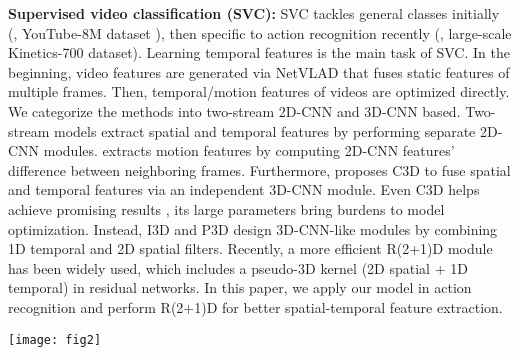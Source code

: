 \documentclass[10pt,twocolumn,letterpaper]{article}
\newlength\figsep\setlength{\figsep}{-2.8ex}
\begin{document}
{\bf Supervised video classification (SVC):}
SVC tackles general classes initially (\eg, YouTube-8M dataset \cite{abu2016youtube}), then specific to action recognition recently (\eg, large-scale Kinetics-700 dataset\cite{carreira2017quo}).
Learning temporal features is the main task of SVC.
In the beginning, video features are generated via NetVLAD \cite{miech2017learnable,lin2018nextvlad} that fuses static features of multiple frames.
Then, temporal/motion features of videos are optimized directly. 
We categorize the methods into two-stream 2D-CNN and 3D-CNN based.
Two-stream models \cite{simonyan2014two,wang2016temporal,lin2019tsm} extract spatial and temporal features by performing separate 2D-CNN modules.
\cite{jiang2019stm,liu2020teinet} extracts motion features by computing 2D-CNN features' difference between neighboring frames.
Furthermore, \cite{tran2015learning} proposes C3D to fuse spatial and temporal features via an independent 3D-CNN module.
Even C3D helps achieve promising results \cite{feichtenhofer2019slowfast,sudhakaran2020gate}, its large parameters bring burdens to model optimization.
Instead, I3D \cite{carreira2017quo} and P3D \cite{qiu2017learning} design 3D-CNN-like modules by combining 1D temporal and 2D spatial filters. 
Recently, a more efficient R(2+1)D module \cite{tran2018closer} has been widely used, which includes a pseudo-3D kernel (2D spatial + 1D temporal) in residual networks.
In this paper, we apply our model in action recognition and perform R(2+1)D for better spatial-temporal feature extraction.
\begin{figure*}
    \centering
    \texttt{[image: fig2]}
    \caption{
            {\bf Architecture of AURL:} 
            From left to right, we map a video sequence  and the class name set  to a unified representation (, ).
            During training, to learn representations of seen classes, we introduce  to preserve {\em alignment} and {\em uniformity} properties.
            For synthetic unseen classes, we introduce  to learn the two properties on synthetic visual-semantic features ().
            To synthesize features of unseen classes, we first utilize  to learn {\em visual centers} , then propose {\em Class Generator} to transform  and existing semantics  into the representation ().
            During inference, we perform an NNS strategy to obtain the final class.
            }
    \label{fig:fig2}
    \vspace{\figsep}
\end{figure*}
\end{document}
